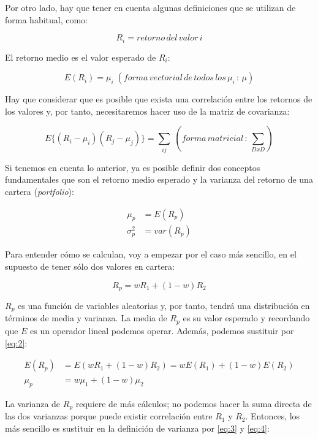 Por otro lado, hay que tener en cuenta algunas definiciones que se utilizan de forma habitual, como:

\begin{equation*}
	R_{i} = retorno\, del\, valor\, i
\end{equation*}

El retorno medio es el valor esperado de $R_{i}$:

\begin{equation}
	E(R_{i}) = \mu_{i}\;  (forma\, vectorial\, de\, todos\, los\, \mu_{i}\, :\, \mu)
\end{equation}

Hay que considerar que es posible que exista una correlación entre los retornos de los valores y, por tanto, necesitaremos hacer uso de la matriz de covarianza:

\begin{equation}
	E\{(R_{i}-\mu_{i}) (R_{j}-\mu_{j})\} = \sum_{ij}\;  (forma\, matricial\, :\, \sum_{DxD})
\end{equation}

Si tenemos en cuenta lo anterior, ya es posible definir dos conceptos fundamentales que son el retorno medio esperado y la varianza del retorno de una cartera (\emph{portfolio}):

\begin{align} \label{eq:2}
	\mu_{p} &= E(R_{p})\\
	\sigma_{p}^{2} &= var(R_{p})
\end{align}

Para entender cómo se calculan, voy a empezar por el caso más  sencillo, en el supuesto de tener sólo dos valores en cartera:

\begin{equation} \label{eq:3}
	R_{p} = wR_{1} + (1 - w)R_{2}
\end{equation}

$R_{p}$ es una función de variables aleatorias y, por tanto, tendrá una distribución en términos de media y varianza. La media de $R_{p}$ es su valor esperado y recordando que $E$ es un operador lineal podemos operar. Además, podemos sustituir por \ref{eq:2}:

\begin{align} 
    E(R_{p}) &= E(wR_{1} + (1-w)R_{2}) = wE(R_{1}) + (1-w)E(R_{2}) \\
    \mu_{p}  &= w\mu_{1} + (1-w)\mu_{2}
    \label{eq:4}
\end{align}

La varianza de $R_{p}$ requiere de más cálculos; no podemos hacer la suma directa de las dos varianzas porque puede existir correlación entre $R_{1}$ y $R_{2}$. Entonces, los más sencillo es sustituir en la definición de varianza por \ref{eq:3} y \ref{eq:4}:

